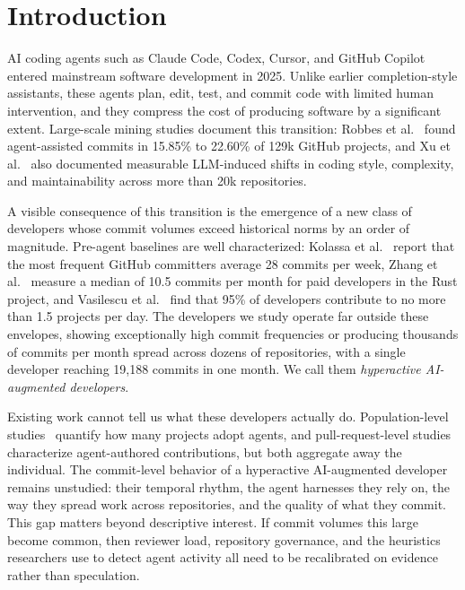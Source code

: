 \documentclass[smallextended]{svjour3}
\begin{document}
\section{Introduction}
\label{sec:intro}

AI coding agents such as Claude Code, Codex, Cursor, and GitHub Copilot entered mainstream software development in 2025.
Unlike earlier completion-style assistants, these agents plan, edit, test, and commit code with limited human intervention, and they compress the cost of producing software by a significant extent.
Large-scale mining studies document this transition: Robbes et al.~\cite{Robbes2026} found agent-assisted commits in 15.85\% to 22.60\% of 129k GitHub projects, and Xu et al.~\cite{Xu2026} also documented measurable LLM-induced shifts in coding style, complexity, and maintainability across more than 20k repositories.

A visible consequence of this transition is the emergence of a new class of developers whose commit volumes exceed historical norms by an order of magnitude.
Pre-agent baselines are well characterized: Kolassa et al.~\cite{kolassa2013empirical} report that the most frequent GitHub committers average 28 commits per week, Zhang et al.~\cite{zhang2024how} measure a median of 10.5 commits per month for paid developers in the Rust project, and Vasilescu et al.~\cite{Vasilescu2016sky} find that 95\% of developers contribute to no more than 1.5 projects per day.
The developers we study operate far outside these envelopes, showing exceptionally high commit frequencies or producing thousands of commits per month spread across dozens of repositories, with a single developer reaching 19,188 commits in one month.
We call them \emph{hyperactive AI-augmented developers}.

Existing work cannot tell us what these developers actually do.
Population-level studies~\cite{Robbes2026,Xu2026} quantify how many projects adopt agents, and pull-request-level studies~\cite{Alam2026,ogenrwot2026ai} characterize agent-authored contributions, but both aggregate away the individual.
The commit-level behavior of a hyperactive AI-augmented developer remains unstudied: their temporal rhythm, the agent harnesses they rely on, the way they spread work across repositories, and the quality of what they commit.
This gap matters beyond descriptive interest.
If commit volumes this large become common, then reviewer load, repository governance, and the heuristics researchers use to detect agent activity all need to be recalibrated on evidence rather than speculation.
\end{document}
